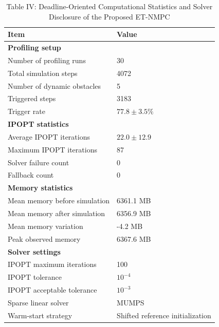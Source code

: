 \documentclass[12pt, twosides]{article}
\theoremstyle{definition}
\begin{document}
\begin{table}[t]
	\captionsetup{labelformat=empty}
	\caption{Table IV: Deadline-Oriented Computational Statistics and Solver Disclosure of the Proposed ET-NMPC}
	\label{tab:response_computational_profiling}
	\centering
	\footnotesize
	\setlength{\tabcolsep}{2.5pt}
	\renewcommand{\arraystretch}{1.12}
	\begin{tabular}{p{}p{}}
		\toprule
		\textbf{Item} & \textbf{Value} \\
		\midrule
		\multicolumn{2}{l}{\textbf{Profiling setup}} \\
		Number of profiling runs & 30 \\
		Total simulation steps & 4072 \\
		Number of dynamic obstacles & 5 \\
		Triggered steps & 3183 \\
		Trigger rate & $77.8 \pm 3.5\%$ \\
		\midrule
		\multicolumn{2}{l}{\textbf{IPOPT statistics}} \\
		Average IPOPT iterations & $22.0 \pm 12.9$ \\
		Maximum IPOPT iterations & 87 \\
		Solver failure count & 0 \\
		Fallback count & 0 \\
		\midrule
		\multicolumn{2}{l}{\textbf{Memory statistics}} \\
		Mean memory before simulation & 6361.1 MB \\
		Mean memory after simulation & 6356.9 MB \\
		Mean memory variation & -4.2 MB \\
		Peak observed memory & 6367.6 MB \\
		\midrule
		\multicolumn{2}{l}{\textbf{Solver settings}} \\
		IPOPT maximum iterations & 100 \\
		IPOPT tolerance & $10^{-4}$ \\
		IPOPT acceptable tolerance & $10^{-3}$ \\
		Sparse linear solver & MUMPS \\
		Warm-start strategy & Shifted reference initialization \\
		\bottomrule
	\end{tabular}


\end{table}
\end{document}
